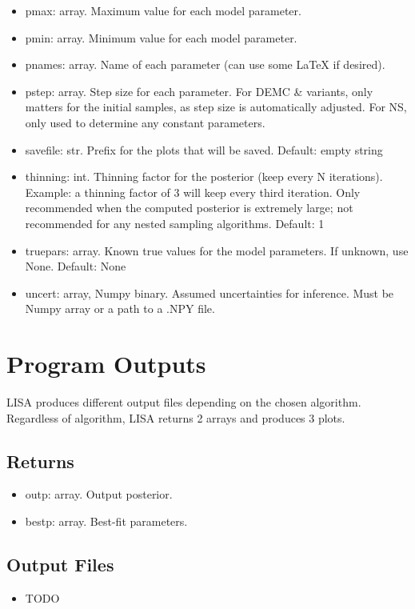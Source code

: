 \documentclass[letterpaper, 12pt]{article}
\begin{document}
\begin{itemize}
\item pmax: array. Maximum value for each model parameter.
\item pmin: array. Minimum value for each model parameter.
\item pnames: array. Name of each parameter (can use some LaTeX if desired).
\item pstep: array. Step size for each parameter.  For DEMC \& variants, only 
                    matters for the initial samples, as step size is automatically adjusted.
                    For NS, only used to determine any constant parameters.
\item savefile: str. Prefix for the plots that will be saved. Default: empty string
\item thinning: int. Thinning factor for the posterior (keep every N iterations). Example: a thinning factor of 3 will keep every third iteration.  Only recommended when the computed posterior is extremely large; not recommended for any nested sampling algorithms.  Default: 1
\item truepars: array. Known true values for the model parameters.  
                       If unknown, use None.  Default: None
\item uncert: array, Numpy binary. Assumed uncertainties for inference. Must be 
                                   Numpy array or a path to a .NPY file.
\end{itemize}


\section{Program Outputs}
\label{sec:outputs}

LISA produces different output files depending on the chosen algorithm.
Regardless of algorithm, LISA returns 2 arrays and produces 3 plots.

\subsection{Returns}
\begin{itemize}
\item outp: array. Output posterior.
\item bestp: array. Best-fit parameters.
\end{itemize}

\subsection{Output Files}
\begin{itemize}
\item TODO
\end{itemize}
\end{document}
